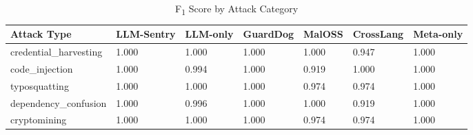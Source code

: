 \begin{table}[t]
\centering
\caption{F\textsubscript{1} Score by Attack Category}
\label{tab:f1_by_attack}
\small
\begin{tabular}{lllllll}
\toprule
\textbf{Attack Type} & \textbf{LLM-Sentry} & \textbf{LLM-only} & \textbf{GuardDog} & \textbf{MalOSS} & \textbf{CrossLang} & \textbf{Meta-only} \\
\midrule
credential\_harvesting & 1.000 & 1.000 & 1.000 & 1.000 & 0.947 & 1.000 \\
code\_injection & 1.000 & 0.994 & 1.000 & 0.919 & 1.000 & 1.000 \\
typosquatting & 1.000 & 1.000 & 1.000 & 0.974 & 0.974 & 1.000 \\
dependency\_confusion & 1.000 & 0.996 & 1.000 & 1.000 & 0.919 & 1.000 \\
cryptomining & 1.000 & 1.000 & 1.000 & 0.974 & 0.974 & 1.000 \\
\bottomrule
\end{tabular}
\end{table}